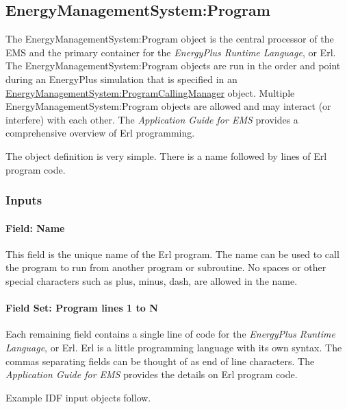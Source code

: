 \subsection{EnergyManagementSystem:Program}\label{energymanagementsystemprogram}

The EnergyManagementSystem:Program object is the central processor of the EMS and the primary container for the \emph{EnergyPlus Runtime Language}, or Erl. The EnergyManagementSystem:Program objects are run in the order and point during an EnergyPlus simulation that is specified in an \hyperref[energymanagementsystemprogramcallingmanager]{EnergyManagementSystem:ProgramCallingManager} object. Multiple EnergyManagementSystem:Program objects are allowed and may interact (or interfere) with each other. The \emph{Application Guide for EMS} provides a comprehensive overview of Erl programming.

The object definition is very simple. There is a name followed by lines of Erl program code.

\subsubsection{Inputs}\label{inputs-3-011}

\paragraph{Field: Name}\label{field-name-3-010}

This field is the unique name of the Erl program. The name can be used to call the program to run from another program or subroutine. No spaces or other special characters such as plus, minus, dash, are allowed in the name.

\paragraph{Field Set: Program lines 1 to N}\label{field-set-program-lines-1-to-n}

Each remaining field contains a single line of code for the \emph{EnergyPlus Runtime Language}, or Erl. Erl is a little programming language with its own syntax. The commas separating fields can be thought of as end of line characters. The \emph{Application Guide for EMS} provides the details on Erl program code.

Example IDF input objects follow.

